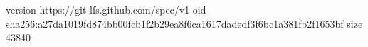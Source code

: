 version https://git-lfs.github.com/spec/v1
oid sha256:a27da1019fd874bb00fcb1f2b29ea8f6ca1617dadedf3f6bc1a381fb2f1653bf
size 43840
